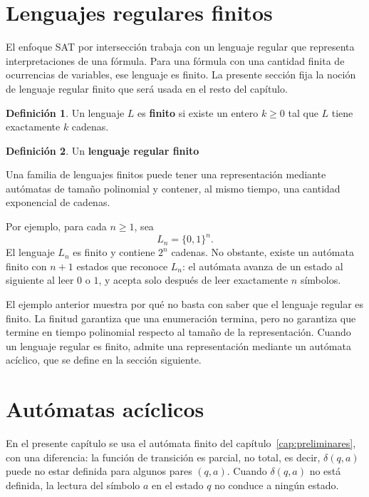 \documentclass{report}
\theoremstyle{definition}
\newtheorem{definicion}{Definición}[chapter]
\theoremstyle{plain}
\theoremstyle{remark}
\begin{document}
\section{Lenguajes regulares finitos}
\label{sec:lenguajes-regulares-finitos}

El enfoque SAT por intersección trabaja con un lenguaje regular que
representa interpretaciones de una fórmula. Para una fórmula con una
cantidad finita de ocurrencias de variables, ese lenguaje es finito. La presente
sección fija la noción de lenguaje regular finito que será usada en el
resto del capítulo.

\begin{definicion}
  Un lenguaje $L$ es \textbf{finito} si existe un entero $k \ge 0$ tal
  que $L$ tiene exactamente $k$ cadenas.
\end{definicion}

\begin{definicion}
  Un \textbf{lenguaje regular finito} 
\end{definicion}

Una familia de lenguajes finitos puede tener
una representación mediante autómatas de tamaño polinomial y contener,
al mismo tiempo, una cantidad exponencial de cadenas.

Por ejemplo, para cada $n \ge 1$, sea
\[
  L_n = \{0,1\}^n.
\]
El lenguaje $L_n$ es finito y contiene $2^n$ cadenas. No obstante,
existe un autómata finito con $n+1$ estados que reconoce
$L_n$: el autómata avanza de un estado al siguiente al leer $0$ o $1$, y
acepta solo después de leer exactamente $n$ símbolos.

El ejemplo anterior muestra por qué no basta con saber que el lenguaje
regular es finito. La finitud garantiza que una enumeración termina, pero
no garantiza que termine en tiempo polinomial respecto al tamaño de la
representación. Cuando un lenguaje regular es finito, admite una
representación mediante un autómata acíclico, que se define en la
sección siguiente.

\section{Autómatas acíclicos}
\label{sec:automatas-aciclicos}

En el presente capítulo se usa el autómata finito del
capítulo~\ref{cap:preliminares}, con una diferencia: la función de
transición es parcial, no total, es decir, $\delta(q,a)$ puede no estar
definida para algunos pares $(q,a)$. Cuando $\delta(q,a)$ no está
definida, la lectura del símbolo $a$ en el estado $q$ no conduce a
ningún estado.
\end{document}
